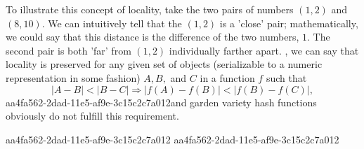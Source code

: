 \documentclass[12pt]{article}
\begin{document}
\par To illustrate this concept of locality, take the two pairs of numbers $(1,2)$ and $(8,10)$. We can intuitively tell that the $(1,2)$ is a 'close' pair; mathematically, we could say that this distance is the difference of the two numbers, $1$. The second pair is both 'far' from $(1,2)$ individually farther apart. , we can say that locality is preserved for any given set of objects (serializable to a numeric representation in some fashion) $A,B,$ and $C$ in a function $f$ such that
\begin{equation}
|A-B| < |B-C| \Rightarrow |f(A)-f(B)| < |f(B) - f(C)|,
\end{equation}
aa4fa562-2dad-11e5-af9e-3c15c2c7a012and garden variety hash functions obviously do not fulfill this requirement.

aa4fa562-2dad-11e5-af9e-3c15c2c7a012\printbibliography
aa4fa562-2dad-11e5-af9e-3c15c2c7a012
\end{document}
